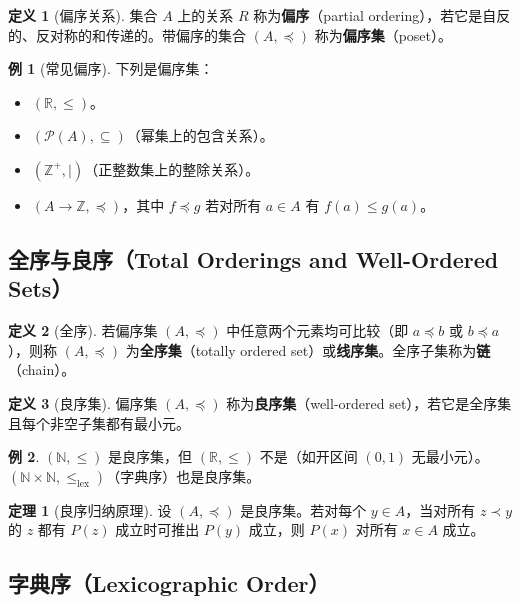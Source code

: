 \documentclass[UTF8,11pt,a4paper]{ctexbook}   %
\theoremstyle{definition}
\newtheorem{definition}{定义}[section]
\newtheorem{theorem}{定理}[section]
\newtheorem{example}{例}[section]
\begin{document}
\begin{definition}[偏序关系]
集合 $A$ 上的关系 $R$ 称为\textbf{偏序}（partial ordering），若它是自反的、反对称的和传递的。带偏序的集合 $(A,\preceq)$ 称为\textbf{偏序集}（poset）。
\end{definition}

\begin{example}[常见偏序]
下列是偏序集：
\begin{itemize}
    \item $(\mathbb{R}, \leq)$。
    \item $(\mathcal{P}(A), \subseteq)$（幂集上的包含关系）。
    \item $(\mathbb{Z}^+, \mid)$（正整数集上的整除关系）。
    \item $(A \to \mathbb{Z}, \preceq)$，其中 $f \preceq g$ 若对所有 $a \in A$ 有 $f(a) \leq g(a)$。
\end{itemize}
\end{example}

\subsection{全序与良序（Total Orderings and Well-Ordered Sets）}

\begin{definition}[全序]
若偏序集 $(A,\preceq)$ 中任意两个元素均可比较（即 $a \preceq b$ 或 $b \preceq a$），则称 $(A,\preceq)$ 为\textbf{全序集}（totally ordered set）或\textbf{线序集}。全序子集称为\textbf{链}（chain）。
\end{definition}

\begin{definition}[良序集]
偏序集 $(A,\preceq)$ 称为\textbf{良序集}（well-ordered set），若它是全序集且每个非空子集都有最小元。
\end{definition}

\begin{example}
$(\mathbb{N}, \leq)$ 是良序集，但 $(\mathbb{R}, \leq)$ 不是（如开区间 $(0,1)$ 无最小元）。$(\mathbb{N} \times \mathbb{N}, \leq_{\text{lex}})$（字典序）也是良序集。
\end{example}

\begin{theorem}[良序归纳原理]
设 $(A,\preceq)$ 是良序集。若对每个 $y \in A$，当对所有 $z \prec y$ 的 $z$ 都有 $P(z)$ 成立时可推出 $P(y)$ 成立，则 $P(x)$ 对所有 $x \in A$ 成立。
\end{theorem}

\subsection{字典序（Lexicographic Order）}
\end{document}
